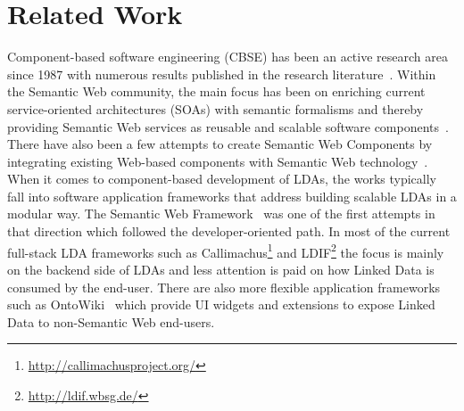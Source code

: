 \documentclass{acm_proc_article-sp}
\begin{document}
\section{Related Work}
Component-based software engineering (CBSE) has been an active research area since 1987 with numerous results published in the research literature~\cite{Vale2015}.
Within the Semantic Web community, the main focus has been on enriching current service-oriented architectures (SOAs) with semantic formalisms and thereby providing Semantic Web services as reusable and scalable software components~\cite{sws2015}.
There have also been a few attempts to create Semantic Web Components by integrating existing Web-based components with Semantic Web technology~\cite{pahl2011}.
When it comes to component-based development of LDAs, the works typically fall into 
software application frameworks that address building scalable LDAs in a modular way.
The Semantic Web Framework~\cite{swFramework2008} was one of the first attempts in that direction which followed the developer-oriented path.
In most of the current full-stack LDA frameworks such as Callimachus\footnote{\url{http://callimachusproject.org/}} and LDIF\footnote{\url{http://ldif.wbsg.de/}} the focus is mainly on the backend side of LDAs and less attention is paid on how Linked Data is consumed by the end-user. 
There are also more flexible application frameworks such as OntoWiki~\cite{ontowiki-swj} which provide UI widgets and extensions to expose Linked Data to non-Semantic Web end-users.
\end{document}
